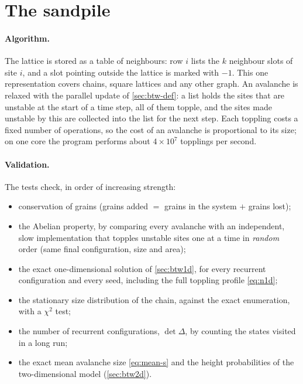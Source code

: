 \section{The sandpile}
\label{sec:num-btw}

\paragraph{Algorithm.} The lattice is stored as a table of neighbours: row $i$ lists the $k$ neighbour slots of site $i$, and a slot
pointing outside the lattice is marked with $-1$. This one representation covers chains, square lattices and any other graph. An
avalanche is relaxed with the parallel update of \cref{sec:btw-def}: a list holds the sites that are unstable at the start of a time
step, all of them topple, and the sites made unstable by this are collected into the list for the next step. Each toppling costs a fixed
number of operations, so the cost of an avalanche is proportional to its size; on one core the program performs about $4\times10^7$
topplings per second.

\paragraph{Validation.} The tests check, in order of increasing strength:
\begin{itemize}[nosep]
  \item conservation of grains (grains added $=$ grains in the system $+$ grains lost);
  \item the Abelian property, by comparing every avalanche with an independent, slow implementation that topples unstable sites one at a
    time in \emph{random} order (same final configuration, size and area);
  \item the exact one-dimensional solution of \cref{sec:btw1d}, for every recurrent configuration and every seed, including the full
    toppling profile \cref{eq:n1d};
  \item the stationary size distribution of the chain, against the exact enumeration, with a $\chi^2$ test;
  \item the number of recurrent configurations, $\det\Delta$, by counting the states visited in a long run;
  \item the exact mean avalanche size \cref{eq:mean-s} and the height probabilities of the two-dimensional model (\cref{sec:btw2d}).
\end{itemize}

